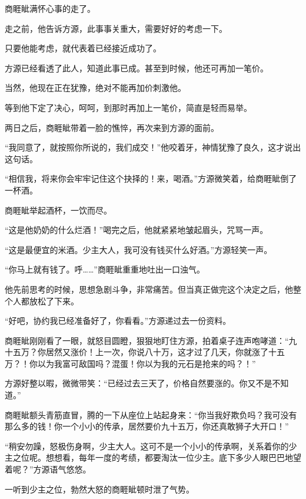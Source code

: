 
\begin{this_body}



商睚眦满怀心事的走了。

走之前，他告诉方源，此事事关重大，需要好好的考虑一下。

只要他能考虑，就代表着已经接近成功了。

方源已经看透了此人，知道此事已成。甚至到时候，他还可再加一笔价。

当然，他现在正在犹豫，绝对不能再加价刺激他。

等到他下定了决心，呵呵，到那时再加上一笔价，简直是轻而易举。

两日之后，商睚眦带着一脸的憔悴，再次来到方源的面前。

“我同意了，就按照你所说的，我们成交！”他咬着牙，神情犹豫了良久，这才说出这句话。

“相信我，将来你会牢牢记住这个抉择的！来，喝酒。”方源微笑着，给商睚眦倒了一杯酒。

商睚眦举起酒杯，一饮而尽。

“这是他奶奶的什么烂酒！”喝完之后，他就紧紧地皱起眉头，咒骂一声。

“这是最便宜的米酒。少主大人，我可没有钱买什么好酒。”方源轻笑一声。

“你马上就有钱了。呼……”商睚眦重重地吐出一口浊气。

他先前思考的时候，思想急剧斗争，非常痛苦。但当真正做完这个决定之后，他整个人都放松了下来。

“好吧，协约我已经准备好了，你看看。”方源递过去一份资料。

商睚眦刚刚看了一眼，就怒目圆瞪，狠狠地盯住方源，拍着桌子连声咆哮道：“九十五万？你居然又涨价！上一次，你说八十万，这才过了几天，你就涨了十五万？！你以为我富可敌国吗？混蛋！你以为我的元石是抢来的吗？！”

方源好整以暇，微微带笑：“已经过去三天了，价格自然要涨的。你又不是不知道。”

商睚眦额头青筋直冒，腾的一下从座位上站起身来：“你当我好欺负吗？我可没有那么多的钱！你一个小小的传承，居然要价九十五万，你还真敢狮子大开口！”

“稍安勿躁，怒极伤身啊，少主大人。这可不是一个小小的传承啊，关系着你的少主之位呢。想想看，每年一度的考绩，都要淘汰一位少主。底下多少人眼巴巴地望着呢？”方源语气悠悠。

一听到少主之位，勃然大怒的商睚眦顿时泄了气势。


\end{this_body}
